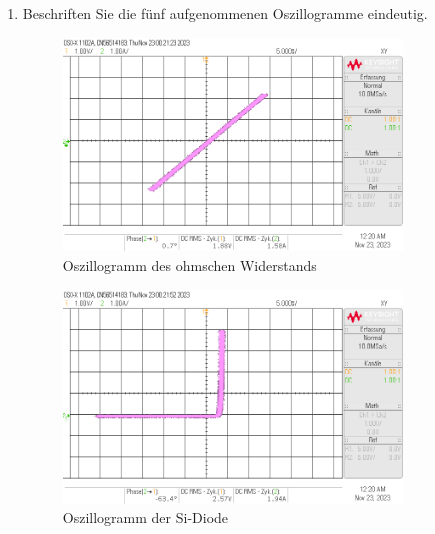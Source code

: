 \begin{enumerate}[label=\alph*)]
	\item Beschriften Sie die fünf aufgenommenen Oszillogramme eindeutig.

	      \begin{figure}[h!]
		      \begin{center}
            \includegraphics[width=0.85\textwidth]{img/V1/3.2.Widerstand.png}
			      \caption{Oszillogramm des ohmschen Widerstands}
		      \end{center}
	      \end{figure}

\pagebreak
	      \begin{figure}[h!]
		      \begin{center}
			      \includegraphics[width=0.85\textwidth]{img/V1/3.2.Diode_Si.png}
			      \caption{Oszillogramm der Si-Diode}
		      \end{center}
	      \end{figure}


\end{enumerate}
